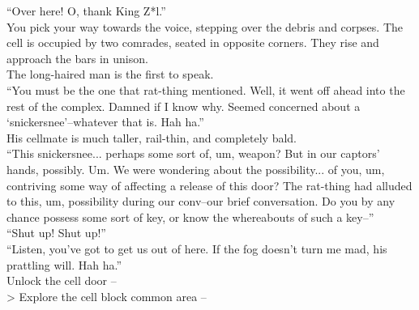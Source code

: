 “Over here! O, thank King Z*l.”\\

You pick your way towards the voice, stepping over the debris and corpses. The cell is occupied by two comrades, seated in opposite corners. They rise and approach the bars in unison.\\

The long-haired man is the first to speak.\\
“You must be the one that rat-thing mentioned. Well, it went off ahead into the rest of the complex. Damned if I know why. Seemed concerned about a ‘snickersnee’--whatever that is. Hah ha.”\\

His cellmate is much taller, rail-thin, and completely bald.\\
“This snickersnee... perhaps some sort of, um, weapon? But in our captors’ hands, possibly. Um. We were wondering about the possibility... of you, um, contriving some way of affecting a release of this door? The rat-thing had alluded to this, um, possibility during our conv--our brief conversation. Do you by any chance possess some sort of key, or know the whereabouts of such a key--”\\

“Shut up! Shut up!”\\

“Listen, you’ve got to get us out of here. If the fog doesn’t turn me mad, his prattling will. Hah ha.”\\

 Unlock the cell door -- \\
> Explore the cell block common area -- 